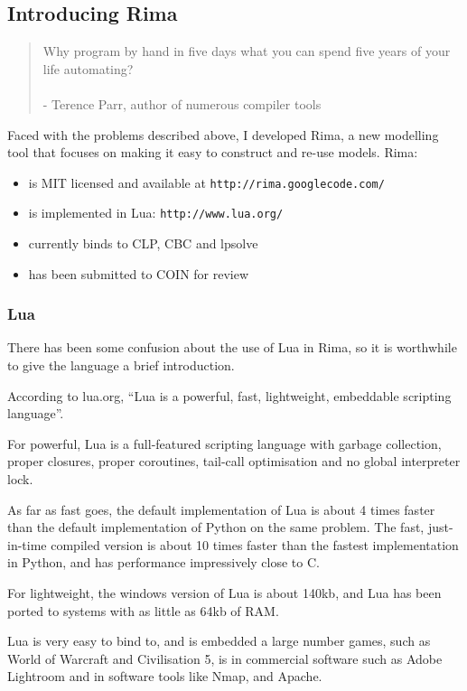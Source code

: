 \documentclass[a4paper,12pt]{article}
\begin{document}
\subsection{Introducing Rima}
\begin{quote}
  Why program by hand in five days what you can spend five years of your life automating?\\
  ~\\
  - Terence Parr, author of numerous compiler tools
\end{quote}

Faced with the problems described above, I developed Rima,
a new modelling tool that focuses on making it easy to construct and re-use models.
Rima:
  \begin{itemize}
    \item is MIT licensed and available at {\tt http://rima.googlecode.com/}
    \item is implemented in Lua: {\tt http://www.lua.org/}
    \item currently binds to CLP, CBC and lpsolve
    \item has been submitted to COIN for review
  \end{itemize}

\subsubsection{Lua}
There has been some confusion about the use of Lua in Rima, so it is worthwhile to give the language a brief introduction.

According to lua.org, ``Lua is a powerful, fast, lightweight, embeddable scripting language''.

For powerful, Lua is a full-featured scripting language with garbage collection, proper closures, proper coroutines, tail-call optimisation and no global interpreter lock.

As far as fast goes, the default implementation of Lua is about 4 times faster than the default implementation of Python on the same problem.  The fast, just-in-time compiled version is about 10 times faster than the fastest implementation in Python, and has performance impressively close to C.

For lightweight, the windows version of Lua is about 140kb, and Lua has been ported to systems with as little as 64kb of RAM.

Lua is very easy to bind to, and is embedded a large number games, such as World of Warcraft and Civilisation 5, is in commercial software such as Adobe Lightroom and in software tools like Nmap, and Apache.
\end{document}
